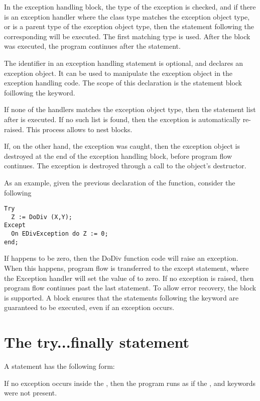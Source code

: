 In the exception handling block, the type of the exception is checked,
and if there is an exception handler where the class type matches the
exception object type, or is a parent type of
the exception object type, then the statement following the corresponding
 will be executed. The first matching type is used. After the
 block was executed, the program continues after the 
statement.

The identifier in an exception handling statement is optional, and declares
an exception object. It can be used to manipulate the exception object in
the exception handling code. The scope of this declaration is the statement
block foillowing the  keyword.

If none of the  handlers matches the exception object type, then the
statement list after  is executed. If no such list is
found, then the exception is automatically re-raised. This process allows
to nest  blocks.

If, on the other hand, the exception was caught, then the exception object is
destroyed at the end of the exception handling block, before program flow
continues. The exception is destroyed through a call to the object's
 destructor.

As an example, given the previous declaration of the  function,
consider the following
\begin{verbatim}
Try
  Z := DoDiv (X,Y);
Except
  On EDivException do Z := 0;
end;
\end{verbatim}
If  happens to be zero, then the DoDiv function code will raise an
exception. When this happens, program flow is transferred to the except
statement, where the Exception handler will set the value of  to
zero. If no exception is raised, then program flow continues past the last
 statement.
To allow error recovery, the  block is supported.
A  block ensures that the statements following the
 keyword are guaranteed to be executed, even if an exception
occurs.


\section{The try...finally statement}
A  statement has the following form:

If no exception occurs inside the , then the program
runs as if the ,  and  keywords were not
present.

